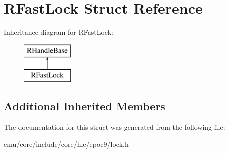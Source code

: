 \hypertarget{struct_r_fast_lock}{}\section{R\+Fast\+Lock Struct Reference}
\label{struct_r_fast_lock}
Inheritance diagram for R\+Fast\+Lock\+:\begin{figure}[H]
\begin{center}
\leavevmode
\includegraphics[height=2.000000cm]{struct_r_fast_lock}
\end{center}
\end{figure}
\subsection*{Additional Inherited Members}


The documentation for this struct was generated from the following file\+:\begin{DoxyCompactItemize}
\item 
emu/core/include/core/hle/epoc9/lock.\+h\end{DoxyCompactItemize}

